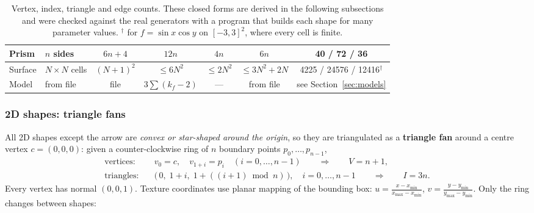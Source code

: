 \documentclass[a4paper, 11pt]{article}
\begin{document}
\begin{table}[H]
{\begin{tabular}{@{}llccccc@{}}
Prism         & $n$ sides            & $6n+4$       & $12n$        & $4n$     & $6n$     & 40 / 72 / 36\\
\midrule
Surface       & $N\times N$ cells    & $(N{+}1)^2$  & $\le 6N^2$   & $\le 2N^2$ & $\le 3N^2{+}2N$ & 4225 / 24576 / 12416$^\dagger$\\
Model         & from file            & file         & $3\sum(k_f{-}2)$ & --- & from file & see Section~\ref{sec:models}\\
\bottomrule
\end{tabular}}
\caption{Vertex, index, triangle and edge counts. These closed forms are derived in the following subsections and
were checked against the real generators with a program that builds each shape for many parameter values. $^\dagger$ for $f=\sin x\cos y$ on $[-3,3]^2$, where every cell is finite.}
\label{tab:counts}
\end{table}

\subsubsection{2D shapes: triangle fans}

All 2D shapes except the arrow are \emph{convex or star-shaped around the origin}, so they are triangulated as a
\textbf{triangle fan} around a centre vertex $c=(0,0,0)$:
given a counter-clockwise ring of $n$ boundary points $p_0,\dots,p_{n-1}$,
\begin{align*}
  \text{vertices:}\quad & v_0 = c,\quad v_{1+i}=p_i \quad (i=0,\dots,n-1) \qquad\Rightarrow\qquad V=n+1,\\
  \text{triangles:}\quad & \bigl(\,0,\; 1+i,\; 1+((i+1)\bmod n)\,\bigr),\quad i=0,\dots,n-1 \qquad\Rightarrow\qquad I=3n.
\end{align*}
Every vertex has normal $(0,0,1)$. Texture coordinates use planar mapping of the bounding box:
$u=\frac{x-x_{\min}}{x_{\max}-x_{\min}}$, $v=\frac{y-y_{\min}}{y_{\max}-y_{\min}}$. Only the ring changes between shapes:
\end{document}
